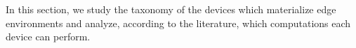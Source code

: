 
In this section, we study the taxonomy of the devices which materialize edge environments and analyze, according to the literature, which computations each device can perform.





%
%    
%
%    
%    

